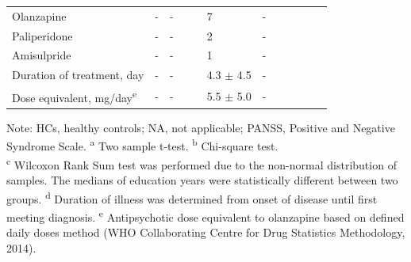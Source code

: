 \begin{refsection}
\begin{table}
\begin{tabular}{@{}llllclllclll@{}}
Olanzapine & - & - & && 7 & - & \\
Paliperidone & - & - & && 2 & - & \\
Amisulpride & - & - & && 1 & - & \\
Duration of treatment, day & - & - & && 4.3 $\pm$ 4.5 & - & \\
Dose equivalent, mg/day\textsuperscript{e} & - & - & && 5.5 $\pm$ 5.0 & - & \\
\bottomrule
\end{tabular}
\begin{flushleft}
\footnotesize
Note: HCs, healthy controls; NA, not applicable; PANSS, Positive and Negative Syndrome Scale. \textsuperscript{a} Two sample t-test. \textsuperscript{b} Chi-square test. \\
\textsuperscript{c} Wilcoxon Rank Sum test was performed due to the non-normal distribution of samples. The medians of education years were statistically different between two groups. \textsuperscript{d} Duration of illness was determined from onset of disease until first meeting diagnosis. \textsuperscript{e} Antipsychotic dose equivalent to olanzapine based on defined daily doses method (WHO Collaborating Centre for Drug Statistics Methodology, 2014).
\end{flushleft}
\label{table1:demongraphics}
\end{table}


\end{refsection}
